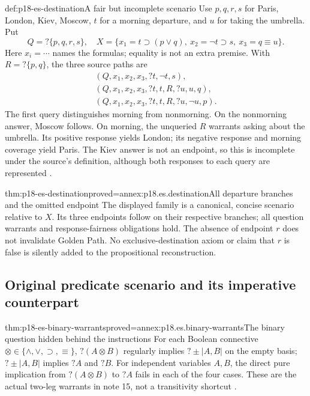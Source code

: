 \begin{hbexample}{def:p18-es-destination}{A fair but incomplete scenario}
Use \(p,q,r,s\) for Paris, London, Kiev, Moscow, \(t\) for a morning
departure, and \(u\) for taking the umbrella. Put
\[
 Q=?\{p,q,r,s\},\quad
 X=\{x_1=t\supset(p\lor q),\ x_2=\neg t\supset s,\ x_3=q\equiv u\}.
\]
Here \(x_i=\cdots\) names the formulas; equality is not an extra premise.
With \(R=?\{p,q\}\), the three source paths are
\[
\begin{array}{l}
 (Q,x_1,x_2,x_3,?t,\neg t,s),\\
 (Q,x_1,x_2,x_3,?t,t,R,?u,u,q),\\
 (Q,x_1,x_2,x_3,?t,t,R,?u,\neg u,p).
\end{array}
\]
The first query distinguishes morning from nonmorning. On the nonmorning
answer, Moscow follows. On morning, the unqueried \(R\) warrants asking
about the umbrella. Its positive response yields London; its negative response
and morning coverage yield Paris. The Kiev answer is not an endpoint, so this
is incomplete under the source's definition, although both responses to each
query are represented \cite[pp.~31--32,35]{Wisniewski2001QuestionsInferences}.
\end{hbexample}

\begin{hbtheorem}{thm:p18-es-destination}{proved=annex:p18.es.destination}{All departure branches and the omitted endpoint}
The displayed family is a canonical, concise scenario relative to \(X\).
Its three endpoints follow on their respective branches; all question warrants
and response-fairness obligations hold. The absence of endpoint \(r\) does
not invalidate Golden Path. No exclusive-destination axiom or claim that
\(r\) is false is silently added to the propositional reconstruction.
\end{hbtheorem}

\subsection{Original predicate scenario and its imperative counterpart}

\begin{hblemma}{thm:p18-es-binary-warrants}{proved=annex:p18.es.binary-warrants}{The binary question hidden behind the instructions}
For each Boolean connective \(\otimes\in\{\land,\lor,\supset,\equiv\}\),
\(?(A\otimes B)\) regularly implies \(?\pm|A,B|\) on the empty
basis; \(?\pm|A,B|\) implies \(?A\) and \(?B\).
For independent variables \(A,B\), the direct pure implication from
\(?(A\otimes B)\) to \(?A\) fails in each of the four cases.
These are the actual two-leg warrants in note 15, not a transitivity shortcut
\cite[pp.~39--40]{Wisniewski2001QuestionsInferences}.
\end{hblemma}

